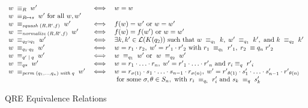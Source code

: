 \documentclass{svproc}
\newcommand{\squash}[3]{\ensuremath{\mathit{squash} \; (#1, #2, #3)}}
\newcommand{\perm}[2]{\ensuremath{\mathit{perm}\; (#1)\; \mathit{with}\; #2}}
\newcommand{\normalize}[3]{\ensuremath{\mathit{normalize} \; (#1, #2, #3)}}
\newcommand{\sep}{\ensuremath{\; | \;}}
\begin{document}
\begin{figure}[t]
  \centering
\[
    \begin{array}{l@{\quad}l@{\quad}l} 
      w \; \equiv_R \; w' &\iff& w = w \\
      w \; \equiv_{R \mapsto s} \; w' \text{ for all }w, w'\\
      w \; \equiv_{\squash{R}{R'}{f}} \; w' &\iff& f(w) = w'
      \text{ or } w = w' \\
      w \; \equiv_{\normalize{R}{R'}{f}} \; w' &\iff&
      f(w)=f(w') \text{ or }w = w'\\
      w \; \equiv_{q_2 \circ q_1} \; w' &\iff& \exists k, k' \in
  \mathcal{L}(K(q_2)) \text{ such that } w \; \equiv_{q_1} \; k, \; w' \;
  \equiv_{q_1} \; k', \text{ and } k \; \equiv_{q_2} \; k'\\
      w \; \equiv_{q_1 \cdot q_2} \; w'  &\iff& w = r_1
      \cdot r_2, \; w' = {r'}_1 \cdot {r'}_2 \text{ with } r_1 \; \equiv_{q_1}
      \; {r'}_1, \; r_2 \; \equiv{q_n} \; {r'}_2\\
      w \; \equiv_{q' \sep q} \; w' &\iff& w \; \equiv_{q_1} \; w'
      \text{ or } \; w \; \equiv_{q_2} \; w'\\
      w \; \equiv_{q*} \; w' &\iff& w = r_1 \cdot \ldots \cdot r_n, \; w'
      = {r'}_1 \cdot \ldots \cdot {r'}_n \text{ and } r_i \equiv_{q} \; {r'}_i
      \\
      w \; \equiv_{\perm{q_1, \ldots, q_n}{q}} \; w' &\iff& w = r_{\sigma(1)}
      \cdot s_1 \cdot \ldots \cdot s_{n-1} \cdot r_{\sigma(n)}, \;
    w' = {r'}_{\theta(1)} \cdot s'_1 \cdot \ldots \cdot s'_{n-1}
    \cdot {r'}_{\theta(n)} \\
    & & \text{ for some } \sigma, \theta \in S_n, \text{ with } r_i \;
    \equiv_{q_i} \; r'_i \text{ and } s_k \; \equiv_{q} \; s'_{k}
    \end{array}
    \]
  \caption{QRE Equivalence Relations}
  \label{fig:relations}
\end{figure}
\end{document}
